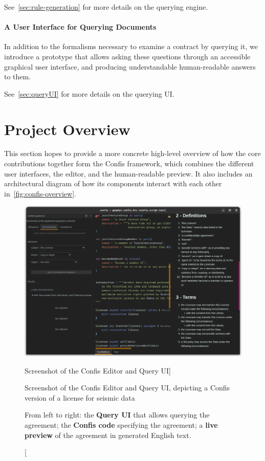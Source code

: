 See~\autoref{sec:rule-generation} for more details on the querying engine.

\paragraph{A User Interface for Querying Documents} In addition to the formalisms necessary to examine a contract by querying it, we introduce a prototype that allows asking these questions through an accessible graphical user interface, and producing understandable human-readable answers to them.

See~\autoref{sec:queryUI} for more details on the querying UI\@.

\section*{Project Overview}

This section hopes to provide a more concrete high-level overview of how the core contributions together form the Confis framework, which combines the different user interfaces, the editor, and the human-readable preview.
It also includes an architectural diagram of how its components interact with each other in~\autoref{fig:confis-overview}.

\begin{figure}[h]
    \centering
    \includegraphics[width=\columnwidth]{figures/confis.full-geophys}
    \caption
    [Screenshot of the Confis Editor and Query UI]
    {Screenshot of the Confis Editor and Query UI, depicting a Confis version of a license for seismic data~\cite{seismicDataLicence}
    \par\footnotesize

    From left to right: the \textbf{Query UI} that allows querying the agreement; the \textbf{Confis code} specifying the agreement; a \textbf{live preview} of the agreement in generated English text.
    }
    \label{fig:geophys-full-editor}
\end{figure}

